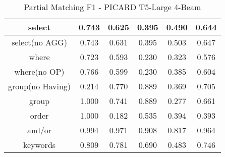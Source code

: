\begin{table}[h]
    \centering
    \begin{tabular}{|c|c|c|c|c|c|}
        \hline
        select           & 0.743 & 0.625 & 0.395 & 0.490 & 0.644 \\ \hline
        select(no AGG)   & 0.743 & 0.631 & 0.395 & 0.503 & 0.647 \\ \hline
        where            & 0.723 & 0.593 & 0.230 & 0.323 & 0.576 \\ \hline
        where(no OP)     & 0.766 & 0.599 & 0.230 & 0.385 & 0.604 \\ \hline
        group(no Having) & 0.214 & 0.770 & 0.889 & 0.369 & 0.705 \\ \hline
        group            & 1.000 & 0.741 & 0.889 & 0.277 & 0.661 \\ \hline
        order            & 1.000 & 0.182 & 0.535 & 0.394 & 0.393 \\ \hline
        and/or           & 0.994 & 0.971 & 0.908 & 0.817 & 0.964 \\ \hline
        keywords         & 0.809 & 0.781 & 0.690 & 0.483 & 0.746 \\ \hline
    \end{tabular}
    \caption{Partial Matching F1 - PICARD T5-Large 4-Beam}
\end{table}